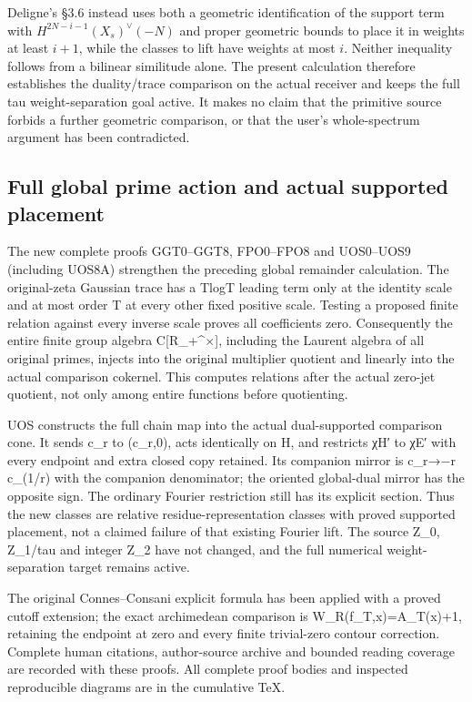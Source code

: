 Deligne's §3.6 instead uses both a geometric identification of the
support term with \(H^{2N-i-1}(X_s)^\vee(-N)\) and proper geometric
bounds to place it in weights at least \(i+1\), while the classes to
lift have weights at most \(i\). Neither inequality follows from a
bilinear similitude alone. The present calculation therefore establishes
the duality/trace comparison on the actual receiver and keeps the full
tau weight-separation goal active. It makes no claim that the primitive
source forbids a further geometric comparison, or that the user's
whole-spectrum argument has been contradicted.

\subsection{Full global prime action and actual supported
placement}\label{full-global-prime-action-and-actual-supported-placement-occurrence-3}

The new complete proofs GGT0--GGT8, FPO0--FPO8 and UOS0--UOS9 (including
UOS8A) strengthen the preceding global remainder calculation. The
original-zeta Gaussian trace has a TlogT leading term only at the
identity scale and at most order T at every other fixed positive scale.
Testing a proposed finite relation against every inverse scale proves
all coefficients zero. Consequently the entire finite group algebra
C{[}R\_+\^{}×{]}, including the Laurent algebra of all original primes,
injects into the original multiplier quotient and linearly into the
actual comparison cokernel. This computes relations after the actual
zero-jet quotient, not only among entire functions before quotienting.

UOS constructs the full chain map into the actual dual-supported
comparison cone. It sends c\_r to (c\_r,0), acts identically on H, and
restricts χH′ to χE′ with every endpoint and extra closed copy retained.
Its companion mirror is c\_r→−r c\_(1/r) with the companion denominator;
the oriented global-dual mirror has the opposite sign. The ordinary
Fourier restriction still has its explicit section. Thus the new classes
are relative residue-representation classes with proved supported
placement, not a claimed failure of that existing Fourier lift. The
source Z\_0, Z\_1/tau and integer Z\_2 have not changed, and the full
numerical weight-separation target remains active.

The original Connes--Consani explicit formula has been applied with a
proved cutoff extension; the exact archimedean comparison is
W\_R(f\_T,x)=A\_T(x)+1, retaining the endpoint at zero and every finite
trivial-zero contour correction. Complete human citations, author-source
archive and bounded reading coverage are recorded with these proofs. All
complete proof bodies and inspected reproducible diagrams are in the
cumulative TeX.

